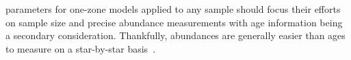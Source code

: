 \documentclass[foo.tex]{subfiles}
\begin{document}
parameters for one-zone models applied to any sample should focus their efforts
on sample size and precise abundance measurements with age information being
a secondary consideration.
Thankfully, abundances are generally easier than ages to measure on a
star-by-star basis~\citep{Soderblom2010, Chaplin2013}.
\end{document}
